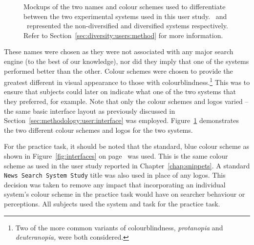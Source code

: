 \begin{figure}[t!]
    \centering
    \caption[Diversity user study interface mockups]{Mockups of the two names and colour schemes used to differentiate between the two experimental systems used in this user study. \hula~and \yoyo~represented the non-diversified and diversified systems respectively. Refer to Section~\ref{sec:diversity:users:method} for more information.}
    \label{fig:interface_headers}
\end{figure}

These names were chosen as they were not associated with any major search engine (to the best of our knowledge), nor did they imply that one of the systems performed better than the other. Colour schemes were chosen to provide the greatest different in visual appearance to those with colourblindness.\footnote{Two of the more common variants of colourblindness, \emph{protanopia} and \emph{deuteranopia,} were both considered.} This was to ensure that subjects could later on indicate what one of the two systems that they preferred, for example. Note that only the colour schemes and logos varied -- the same basic interface layout as previously discussed in Section~\ref{sec:methodology:user:interface} was employed. Figure~\ref{fig:interface_headers} demonstrates the two different colour schemes and logos for the two systems.

For the practice task, it should be noted that the standard, blue colour scheme as shown in Figure~\ref{fig:interfaces} on page~\pageref{fig:interfaces} was used. This is the same colour scheme as used in the user study reported in Chapter~\ref{chap:snippets}. A standard \texttt{News Search System Study} title was also used in place of any logos. This decision was taken to remove any impact that incorporating an individual system's colour scheme in the practice task would have on searcher behaviour or perceptions. All subjects used the  system and task for the practice task.

